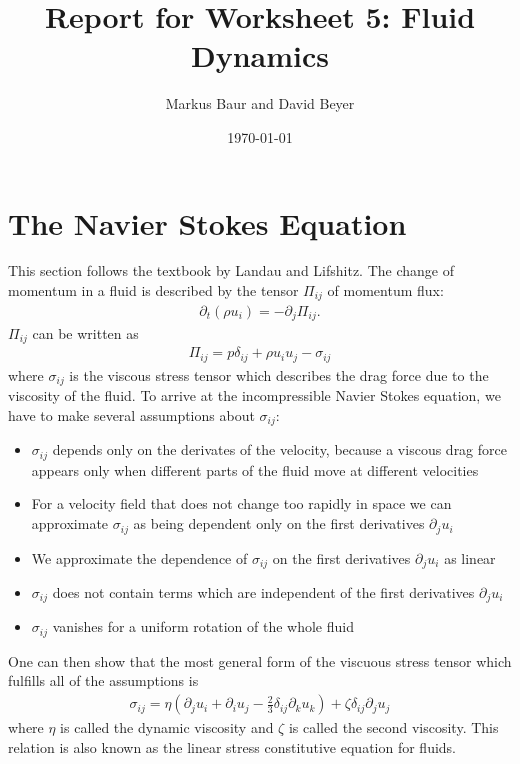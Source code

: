 \documentclass[a4paper,10pt,bibtotoc]{scrartcl}
\begin{document}
\titlehead{Simulation Methods in Physics II \hfill SS 2020}
\title{Report for Worksheet 5: Fluid Dynamics}
\author{Markus Baur and David Beyer}
\date{\today}
\maketitle

\tableofcontents

\section{The Navier Stokes Equation}
This section follows the textbook by Landau and Lifshitz. The change of momentum in a fluid is described by the tensor $\Pi_{ij}$ of momentum flux:
\begin{align}
 \partial_t\left(\rho u_i\right) = -\partial_j \Pi_{ij}.
 \label{eqmom}
\end{align}
$\Pi_{ij}$ can be written as
\begin{align}
 \Pi_{ij} = p\delta_{ij}  + \rho u_i u_j - \sigma_{ij}
\end{align}
where $\sigma_{ij}$ is the viscous stress tensor which describes the drag force due to the viscosity of the fluid. To arrive at the incompressible Navier Stokes equation, we have to make several assumptions about $\sigma_{ij}$:
\begin{itemize}
 \item $\sigma_{ij}$ depends only on the derivates of the velocity, because a viscous drag force appears only when different parts of the fluid move at different velocities
 \item For a velocity field that does not change too rapidly in space we can approximate $\sigma_{ij}$ as being dependent only on the first derivatives $\partial_j u_i$
 \item We approximate the dependence of $\sigma_{ij}$ on the first derivatives $\partial_j u_i$ as linear
 \item $\sigma_{ij}$ does not contain terms which are independent of the first derivatives $\partial_j u_i$
 \item $\sigma_{ij}$ vanishes for a uniform rotation of the whole fluid
\end{itemize}
One can then show that the most general form of the viscuous stress tensor which fulfills all of the assumptions is
\begin{align}
\sigma_{ij} = \eta\left(\partial_j u_i + \partial_i u_j - \frac{2}{3}\delta_{ij} \partial_k u_k\right) + \zeta \delta_{ij} \partial_j u_j
\label{eqst}
\end{align}
where $\eta$ is called the dynamic viscosity and $\zeta$ is called the second viscosity. This relation is also known as the linear stress constitutive equation for fluids.
\end{document}
